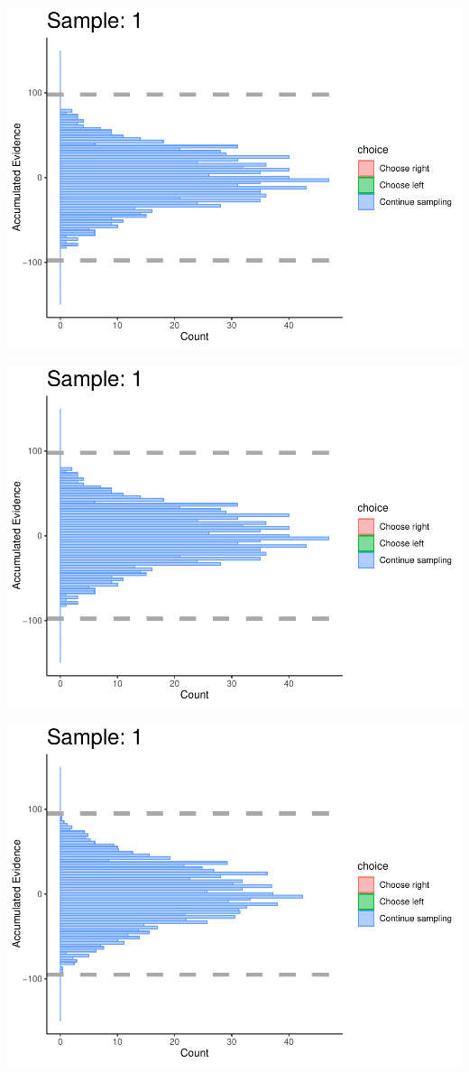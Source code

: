 \documentclass[
]{book}
\begin{document}
\begin{center}\includegraphics[width=0.8\linewidth]{LateNightBayes_files/figure-latex/collapsing_dcb-5} \end{center}

\begin{center}\includegraphics[width=0.8\linewidth]{LateNightBayes_files/figure-latex/collapsing_dcb-6} \end{center}

\begin{center}\includegraphics[width=0.8\linewidth]{LateNightBayes_files/figure-latex/collapsing_dcb-7} \end{center}
\end{document}
